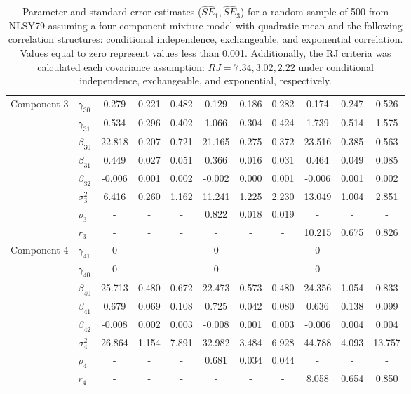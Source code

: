 \begin{table}[ht]
\begin{center}
\begin{tabular}{llccccccccc}
  Component 3 & $\gamma_{30}$ & 0.279 & 0.221 & 0.482 & 0.129 & 0.186 & 0.282 & 0.174 & 0.247 & 0.526 \\ 
    & $\gamma_{31}$ & 0.534 & 0.296 & 0.402 & 1.066 & 0.304 & 0.424 & 1.739 & 0.514 & 1.575 \\ 
    & $\beta_{30}$ & 22.818 & 0.207 & 0.721 & 21.165 & 0.275 & 0.372 & 23.516 & 0.385 & 0.563 \\ 
    & $\beta_{31}$ & 0.449 & 0.027 & 0.051 & 0.366 & 0.016 & 0.031 & 0.464 & 0.049 & 0.085 \\ 
    & $\beta_{32}$ & -0.006 & 0.001 & 0.002 & -0.002 & 0.000 & 0.001 & -0.006 & 0.001 & 0.002 \\ 
    & $\sigma_3^2$ & 6.416 & 0.260 & 1.162 & 11.241 & 1.225 & 2.230 & 13.049 & 1.004 & 2.851 \\ 
    & $\rho_3$ & - & - & - & 0.822 & 0.018 & 0.019 & - & - & - \\ 
    & $r_3$ & - & - & - & - & - & - & 10.215 & 0.675 & 0.826 \\ 
  Component 4 & $\gamma_{41}$ & 0 & - & - & 0 & - & - & 0 & - & - \\ 
    & $\gamma_{40}$ & 0 & - & - & 0 & - & - & 0 & - & - \\ 
    & $\beta_{40}$ & 25.713 & 0.480 & 0.672 & 22.473 & 0.573 & 0.480 & 24.356 & 1.054 & 0.833 \\ 
    & $\beta_{41}$ & 0.679 & 0.069 & 0.108 & 0.725 & 0.042 & 0.080 & 0.636 & 0.138 & 0.099 \\ 
    & $\beta_{42}$ & -0.008 & 0.002 & 0.003 & -0.008 & 0.001 & 0.003 & -0.006 & 0.004 & 0.004 \\ 
    & $\sigma_4^2$ & 26.864 & 1.154 & 7.891 & 32.982 & 3.484 & 6.928 & 44.788 & 4.093 & 13.757 \\ 
    & $\rho_4$ & - & - & - & 0.681 & 0.034 & 0.044 & - & - & - \\ 
    & $r_4$ & - & - & - & - & - & - & 8.058 & 0.654 & 0.850 \\ 
   \hline\end{tabular}
\caption{Parameter and standard error estimates ($\widehat{SE}_{1},\widehat{SE}_{3}$) for a random sample of 500 from NLSY79 assuming a four-component mixture model with quadratic mean and the following correlation structures: conditional independence, exchangeable, and exponential correlation. Values equal to zero represent values less than 0.001. Additionally, the RJ criteria was calculated each covariance assumption: $RJ=7.34, 3.02, 2.22$ under conditional independence, exchangeable, and exponential, respectively.}
\label{tab:dat}
\end{center}
\end{table}

